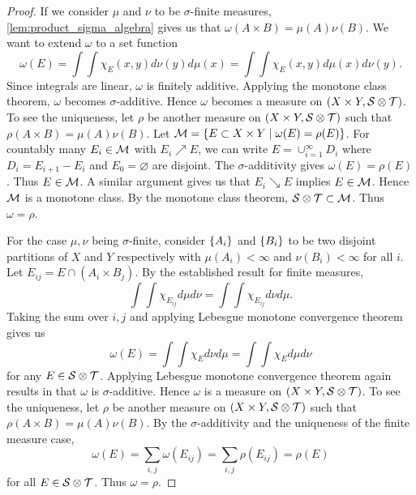 \begin{proof}
    If we consider $\mu$ and $\nu$ to be $\sigma$-finite measures, 
    \cref{lem:product_sigma_algebra} gives us that $\omega(A\times B) = \mu(A)\nu(B)$. 
    We want to extend $\omega$ to a set function 
    \begin{equation*}
        \omega(E) = \int\int \chi_E(x,y)d\nu(y)d\mu(x) = \int\int \chi_E(x,y)d\mu(x)d\nu(y).
    \end{equation*}
    Since integrals are linear, $\omega$ is finitely additive. Applying the 
    monotone class theorem, $\omega$ becomes $\sigma$-additive. Hence $\omega$ 
    becomes a measure on $(X\times Y,\mathcal{S}\otimes\mathcal{T})$. To see the uniqueness, 
    let $\rho$ be another measure on $(X\times Y,\mathcal{S}\otimes\mathcal{T})$ such that 
    $\rho(A\times B) = \mu(A)\nu(B)$. Let $\mathcal{M} = \left\{ E\subset X\times Y \;\middle\vert\; \omega(E) = \rho(E) \right\}$. 
    For countably many $E_i\in\mathcal{M}$ with $E_i\nearrow E$, we can write $E = \cup_{i=1}^\infty D_i$ 
    where $D_i = E_{i+1}-E_i$ and $E_0 = \varnothing$ are disjoint. The $\sigma$-additivity 
    gives $\omega(E) = \rho(E)$. Thus $E\in\mathcal{M}$. A similar argument gives us that 
    $E_i\searrow E$ implies $E\in\mathcal{M}$. Hence $\mathcal{M}$ is a monotone class. By the 
    monotone class theorem, $\mathcal{S}\otimes\mathcal{T}\subset\mathcal{M}$. Thus $\omega = \rho$. 

    For the case $\mu,\nu$ being $\sigma$-finite, consider $\left\{ {A_i} \right\}$ and $\left\{ {B_i} \right\}$ 
    to be two disjoint partitions of $X$ and $Y$ respectively with $\mu(A_i) < \infty$ 
    and $\nu(B_i) < \infty$ for all $i$. Let $E_{ij} = E\cap(A_i\times B_j)$. 
    By the established result for finite measures, 
    \begin{equation*}
        \int\int \chi_{E_{ij}}d\mu d\nu = \int\int \chi_{E_{ij}}d\nu d\mu.
    \end{equation*}
    Taking the sum over $i,j$ and applying Lebesgue monotone convergence 
    theorem gives us 
    \begin{equation*}
        \omega(E) = \int\int \chi_E d\nu d\mu = \int\int \chi_E d\mu d\nu
    \end{equation*}
    for any $E\in\mathcal{S}\otimes\mathcal{T}$. Applying Lebesgue monotone convergence theorem again 
    results in that $\omega$ is $\sigma$-additive. Hence $\omega$ is a measure on 
    $(X\times Y,\mathcal{S}\otimes\mathcal{T})$. To see the uniqueness, let $\rho$ be another measure on 
    $(X\times Y,\mathcal{S}\otimes\mathcal{T})$ such that $\rho(A\times B) = \mu(A)\nu(B)$. By 
    the $\sigma$-additivity and the uniqueness of the finite measure case, 
    \begin{equation*}
        \omega(E) = \sum_{i,j}\omega(E_{ij}) = \sum_{i,j}\rho(E_{ij}) = \rho(E)
    \end{equation*}
    for all $E\in\mathcal{S}\otimes\mathcal{T}$. Thus $\omega = \rho$.
\end{proof}

